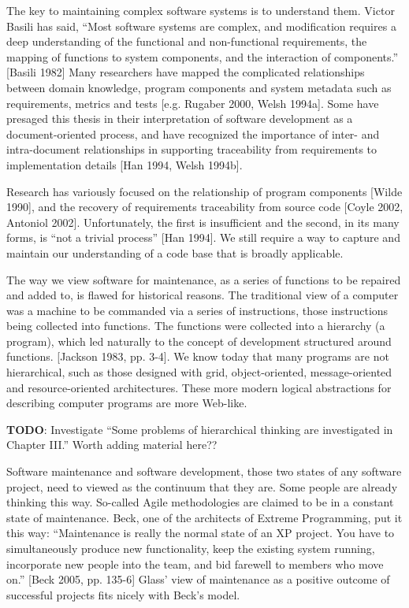 The key to maintaining complex software systems is to understand them. Victor Basili has said, ``Most software systems are complex, and modification requires a deep understanding of the functional and non-functional requirements, the mapping of functions to system components, and the interaction of components.'' [Basili 1982]  Many researchers have mapped the complicated relationships between domain knowledge, program components and system metadata such as requirements, metrics and tests [e.g. Rugaber 2000, Welsh 1994a].  Some have presaged this thesis in their interpretation of software development as a document-oriented process, and have recognized the importance of inter- and intra-document relationships in supporting traceability from requirements to implementation details [Han 1994, Welsh 1994b].

Research has variously focused on the relationship of program components [Wilde 1990], and the recovery of requirements traceability from source code [Coyle 2002, Antoniol 2002]. Unfortunately, the first is insufficient and the second, in its many forms, is ``not a trivial process'' [Han 1994].  We still require a way to capture and maintain our understanding of a code base that is broadly applicable.

The way we view software for maintenance, as a series of functions to be repaired and added to, is flawed for historical reasons.  The traditional view of a computer was a machine to be commanded via a series of instructions, those instructions being collected into functions.  The functions were collected into a hierarchy (a program), which led naturally to the concept of development structured around functions. [Jackson 1983, pp. 3-4].  We know today that many programs are not hierarchical, such as those designed with grid, object-oriented, message-oriented and resource-oriented architectures.  These more modern logical abstractions for describing computer programs are more Web-like.

\textbf{TODO}: Investigate ``Some problems of hierarchical thinking are investigated in Chapter III.'' Worth adding material here??

Software maintenance and software development, those two states of any software project, need to viewed as the continuum that they are.  Some people are already thinking this way.  So-called Agile methodologies are claimed to be in a constant state of maintenance.  Beck, one of the architects of Extreme Programming, put it this way:  ``Maintenance is really the normal state of an XP project.  You have to simultaneously produce new functionality, keep the existing system running, incorporate new people into the team, and bid farewell to members who move on.'' [Beck 2005, pp. 135-6]  Glass' view of maintenance as a positive outcome of successful projects fits nicely with Beck's model.

